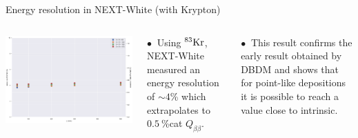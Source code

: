 \documentclass [aspectratio=169]{beamer}
\newcommand{\qbb}{\ensuremath{Q_{\beta\beta}}}
\newcommand{\KR}{\ensuremath{{}^{83}{\rm Kr}}}
\begin{document}
\begin{frame}{Energy resolution in NEXT-White (with Krypton)}

\begin{columns}
\includegraphics[scale=0.23]{eresKr.png}

$\bullet~$ Using \KR, NEXT-White measured an energy resolution of $\sim 4$\% which
extrapolates to $0.5~$\%cat \qbb.

$\bullet~$ This result confirms the early result obtained by DBDM and shows that for point-like
depositions it is possible to reach a value close to intrinsic. 
  
\end{columns}
\end{frame}
\end{document}
